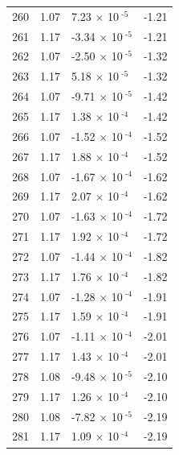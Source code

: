 \documentclass[a4paper,11pt]{article}
\begin{document}
\begin{center}
\begin{longtable}{|R{1.5cm}|R{2.5cm}|R{2.5cm}|R{2.5cm}|}
  260 &   1.07  &         7.23 $\times$ 10$^{\text{          -5}}$  &  -1.21 \\ 
  261 &   1.17  &        -3.34 $\times$ 10$^{\text{          -5}}$  &  -1.21 \\ 
  262 &   1.07  &        -2.50 $\times$ 10$^{\text{          -5}}$  &  -1.32 \\ 
  263 &   1.17  &         5.18 $\times$ 10$^{\text{          -5}}$  &  -1.32 \\ 
  264 &   1.07  &        -9.71 $\times$ 10$^{\text{          -5}}$  &  -1.42 \\ 
  265 &   1.17  &         1.38 $\times$ 10$^{\text{          -4}}$  &  -1.42 \\ 
  266 &   1.07  &        -1.52 $\times$ 10$^{\text{          -4}}$  &  -1.52 \\ 
  267 &   1.17  &         1.88 $\times$ 10$^{\text{          -4}}$  &  -1.52 \\ 
  268 &   1.07  &        -1.67 $\times$ 10$^{\text{          -4}}$  &  -1.62 \\ 
  269 &   1.17  &         2.07 $\times$ 10$^{\text{          -4}}$  &  -1.62 \\ 
  270 &   1.07  &        -1.63 $\times$ 10$^{\text{          -4}}$  &  -1.72 \\ 
  271 &   1.17  &         1.92 $\times$ 10$^{\text{          -4}}$  &  -1.72 \\ 
  272 &   1.07  &        -1.44 $\times$ 10$^{\text{          -4}}$  &  -1.82 \\ 
  273 &   1.17  &         1.76 $\times$ 10$^{\text{          -4}}$  &  -1.82 \\ 
  274 &   1.07  &        -1.28 $\times$ 10$^{\text{          -4}}$  &  -1.91 \\ 
  275 &   1.17  &         1.59 $\times$ 10$^{\text{          -4}}$  &  -1.91 \\ 
  276 &   1.07  &        -1.11 $\times$ 10$^{\text{          -4}}$  &  -2.01 \\ 
  277 &   1.17  &         1.43 $\times$ 10$^{\text{          -4}}$  &  -2.01 \\ 
  278 &   1.08  &        -9.48 $\times$ 10$^{\text{          -5}}$  &  -2.10 \\ 
  279 &   1.17  &         1.26 $\times$ 10$^{\text{          -4}}$  &  -2.10 \\ 
  280 &   1.08  &        -7.82 $\times$ 10$^{\text{          -5}}$  &  -2.19 \\ 
  281 &   1.17  &         1.09 $\times$ 10$^{\text{          -4}}$  &  -2.19 \\ 

\end{longtable}
\end{center}
\end{document}
